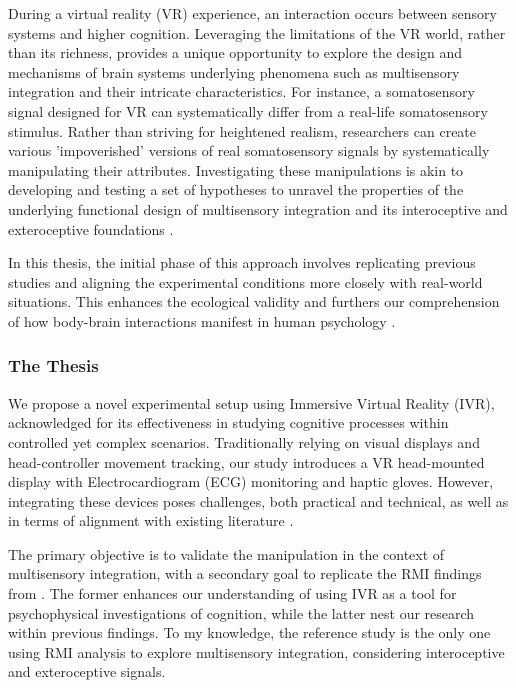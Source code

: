 \documentclass[12pt,oneside,openright]{report}
\begin{document}
During a virtual reality (VR) experience, an interaction occurs between sensory systems and higher cognition. Leveraging the limitations of the VR world, rather than its richness, provides a unique opportunity to explore the design and mechanisms of brain systems underlying phenomena such as multisensory integration and their intricate characteristics. For instance, a somatosensory signal designed for VR can systematically differ from a real-life somatosensory stimulus. Rather than striving for heightened realism, researchers can create various 'impoverished' versions of real somatosensory signals by systematically manipulating their attributes. Investigating these manipulations is akin to developing and testing a set of hypotheses to unravel the properties of the underlying functional design of multisensory integration and its interoceptive and exteroceptive foundations \parencite{deGelder2018VirtualRA}.

In this thesis, the initial phase of this approach involves replicating previous studies and aligning the experimental conditions more closely with real-world situations. This enhances the ecological validity and furthers our comprehension of how body-brain interactions manifest in human psychology \parencite{schmuckler2001ecological}. 


\subsubsection*{The Thesis}

We propose a novel experimental setup using Immersive Virtual Reality (IVR), acknowledged for its effectiveness in studying cognitive processes within controlled yet complex scenarios. Traditionally relying on visual displays and head-controller movement tracking, our study introduces a VR head-mounted display with Electrocardiogram (ECG) monitoring and haptic gloves. However, integrating these devices poses challenges, both practical and technical, as well as in terms of alignment with existing literature \parencite{Klotzsche2023}.

The primary objective is to validate the manipulation in the context of multisensory integration, with a secondary goal to replicate the RMI findings from \textcite{SALTAFOSSI2023108642}. The former enhances our understanding of using IVR as a tool for psychophysical investigations of cognition, while the latter nest our research within previous findings. To my knowledge, the reference study is the only one using RMI analysis to explore multisensory integration, considering interoceptive and exteroceptive signals.
\end{document}
